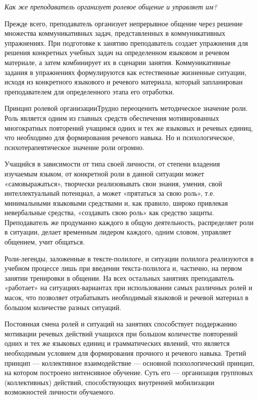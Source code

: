 \textit{Как же преподаватель организует ролевое общение и управляет им?}

Прежде всего, преподаватель организует непрерывное общение через решение множества коммуникативных задач, представленных в коммуникативных упражнениях. При подготовке к занятию преподаватель создает упражнения для решения конкретных учебных задач на определенном языковом и речевом материале, а затем комбинирует их в сценарии занятия. Коммуникативные задания в упражнениях формулируются как естественные жизненные ситуации, исходя из конкретного языкового и речевого материала, который запланирован преподавателем для определенного этапа его отработки.

Принцип ролевой организацииТрудно переоценить методическое значение роли. Роль является одним из главных средств обеспечения мотивированных многократных повторений учащимся одних и тех же языковых и речевых единиц, что необходимо для формирования речевого навыка. Но и психологическое, психотерапевтическое значение роли огромно.

Учащийся в зависимости от типа своей личности, от степени владения изучаемым языком, от конкретной роли в данной ситуации может «самовыражаться», творчески реализовывать свои знания, умения, свой интеллектуальный потенциал, а может «прятаться за свою роль», т.е. минимальными языковыми средствами и, как правило, широко привлекая невербальные средства, «создавать свою роль» как средство защиты. Преподаватель же продуманно  каждого в общую деятельность, распределяет роли в ситуации, делает временным лидером каждого, одним словом, управляет общением, учит общаться.

Роли-легенды, заложенные в тексте-полилоге, и ситуации полилога реализуются в учебном процессе лишь при введении текста-полилога и, частично, на первом занятии тренировки в общении. На всех остальных занятиях преподаватель «работает» на ситуациях-вариантах при использовании самых различных ролей и масок, что позволяет отрабатывать необходимый языковой и речевой материал в большом количестве разных ситуаций.

Постоянная смена ролей и ситуаций на занятиях способствует поддержанию мотивации речевых действий учащихся при большом количестве повторений одних и тех же языковых единиц и грамматических явлений, что является необходимым условием для формирования прочного и  речевого навыка. Третий принцип --- коллективное взаимодействие --- основной психологический принцип, на котором построено интенсивное обучение. Суть его --- организация групповых (коллективных) действий, способствующих внутренней мобилизации возможностей личности обучаемого.


